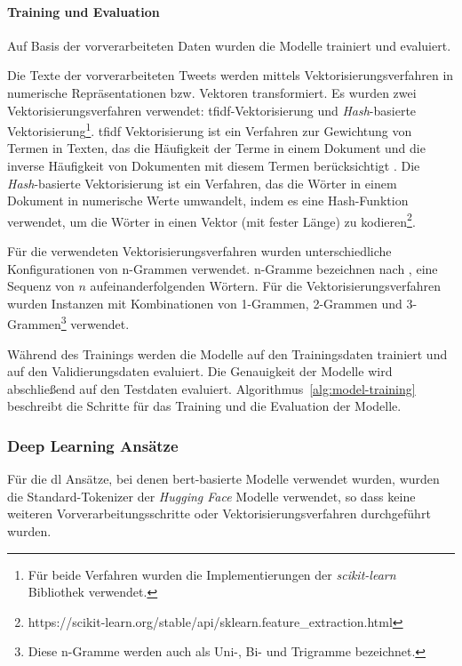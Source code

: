 \paragraph{Training und Evaluation}
Auf Basis der vorverarbeiteten Daten wurden die Modelle trainiert und evaluiert.

Die Texte der vorverarbeiteten Tweets werden mittels Vektorisierungsverfahren in numerische Repräsentationen bzw. Vektoren transformiert.
Es wurden zwei Vekto\-risierungs\-verfahren verwendet: \gls{tfidf}-Vek\-to\-ri\-sie\-rung und \textit{Hash}-basierte Vektorisierung\footnote{Für beide Verfahren wurden die Implementierungen der \textit{scikit-learn} Bibliothek verwendet.}.
\gls{tfidf} Vektorisierung ist ein Verfahren zur Gewichtung von Termen in Texten, das die Häufigkeit der Terme in einem Dokument und die inverse Häufigkeit von Dokumenten mit diesem Termen berücksichtigt \cite[S. 119]{manning2009introduction}.
Die \textit{Hash}-basierte Vektorisierung ist ein Verfahren, das die Wörter in einem Dokument in numerische Werte umwandelt, indem es eine Hash-Funktion verwendet, um die Wörter in einen Vektor (mit fester Länge) zu kodieren\footnote{https://scikit-learn.org/stable/api/sklearn.feature\_extraction.html}.

Für die verwendeten Vektorisierungsverfahren wurden unterschiedliche Konfigurationen von n-Grammen verwendet.
n-Gramme bezeichnen nach \cite[S.33]{jm3}, eine Sequenz von $n$ aufeinanderfolgenden Wörtern.
Für die Vektorisierungsverfahren wurden Instanzen mit Kombinationen von 1-Grammen, 2-Grammen und 3-Grammen\footnote{Diese n-Gramme werden auch als Uni-, Bi- und Trigramme bezeichnet.} verwendet.

Während des Trainings werden die Modelle auf den Trainingsdaten trainiert und auf den Validierungsdaten evaluiert.
Die Genauigkeit der Modelle wird abschließend auf den Testdaten evaluiert.
Algorithmus~\ref{alg:model-training} beschreibt die Schritte für das Training und die Evaluation der Modelle.

\subsubsection{Deep Learning Ansätze} \label{subsubsec:experimente-deep-learning-ansaetze}

Für die \gls{dl} Ansätze, bei denen \gls{bert}-basierte Modelle verwendet wurden, wurden die Standard-Tokenizer der \textit{Hugging Face} Modelle verwendet, so dass keine weiteren Vorverarbeitungsschritte oder Vektorisierungsverfahren durchgeführt wurden.


